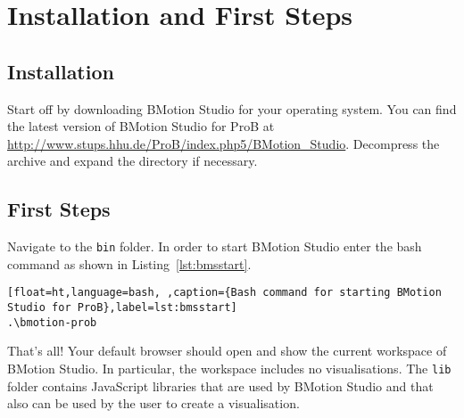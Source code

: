 \section{Installation and First Steps}
\label{tutorial_02}

\subsection{Installation}

Start off by downloading BMotion Studio for your operating system. 
You can find the latest version of BMotion Studio for ProB at \url{http://www.stups.hhu.de/ProB/index.php5/BMotion_Studio}.
Decompress the archive and expand the directory if necessary. 


\subsection{First Steps}

Navigate to the \texttt{bin} folder. 
In order to start BMotion Studio enter the bash command as shown in Listing~\ref{lst:bmsstart}.

\begin{lstlisting}[float=ht,language=bash, ,caption={Bash command for starting BMotion Studio for ProB},label=lst:bmsstart]
.\bmotion-prob
\end{lstlisting}
That's all! 
Your default browser should open and show the current workspace of BMotion Studio.
In particular, the workspace includes no visualisations.
The \texttt{lib} folder contains JavaScript libraries that are used by BMotion Studio and that also can be used by the user to create a visualisation.




